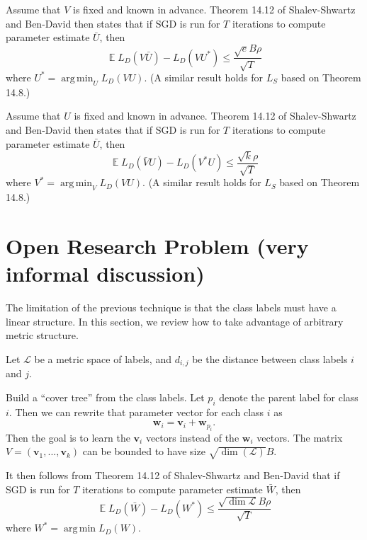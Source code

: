 \documentclass[10pt]{article}
\theoremstyle{definition}
\DeclareMathOperator{\E}{\mathbb E}
\DeclareMathOperator*{\argmin}{arg\,min}
\newcommand{\vv}{\mathbf v}
\newcommand{\w}{\mathbf w}
\newcommand{\dist}[2]{d_{{#1},{#2}}}
\begin{document}
\noindent
Assume that $V$ is fixed and known in advance.
Theorem 14.12 of Shalev-Shwartz and Ben-David then states that if SGD is run for $T$ iterations to compute parameter estimate $\bar U$,
then
\begin{equation}
    \E L_D(V\bar U) - L_D(VU^*) \le \frac {\sqrt eB\rho}{\sqrt T}
\end{equation}
where $U^* = \argmin_U L_D(VU)$.
(A similar result holds for $L_S$ based on Theorem 14.8.)

Assume that $U$ is fixed and known in advance.
Theorem 14.12 of Shalev-Shwartz and Ben-David then states that if SGD is run for $T$ iterations to compute parameter estimate $\bar U$,
then
\begin{equation}
    \E L_D(\bar VU) - L_D(V^*U) \le \frac {\sqrt k\rho}{\sqrt T}
\end{equation}
where $V^* = \argmin_V L_D(VU)$.
(A similar result holds for $L_S$ based on Theorem 14.8.)

\newpage
\section{Open Research Problem (very informal discussion)}

The limitation of the previous technique is that the class labels must have a linear structure.
In this section, we review how to take advantage of arbitrary metric structure.

Let $\mathcal L$ be a metric space of labels,
and $\dist i j$ be the distance between class labels $i$ and $j$.

Build a ``cover tree'' from the class labels.
Let $p_i$ denote the parent label for class $i$.
Then we can rewrite that parameter vector for each class $i$ as
\begin{equation}
    \w_i = \vv_i + \w_{p_i}
    .
\end{equation}
Then the goal is to learn the $\vv_i$ vectors instead of the $\w_i$ vectors.
The matrix $V=(\vv_1,...,\vv_k)$ can be bounded to have size $\sqrt{\dim(\mathcal L)}B$.

It then follows from Theorem 14.12 of Shalev-Shwartz and Ben-David that if SGD is run for $T$ iterations to compute parameter estimate $\bar W$,
then
\begin{equation}
    \E L_D(\bar W) - L_D(W^*) \le \frac {\sqrt {\dim \mathcal L}B\rho}{\sqrt T}
\end{equation}
where $W^* = \argmin L_D(W)$.
\end{document}
